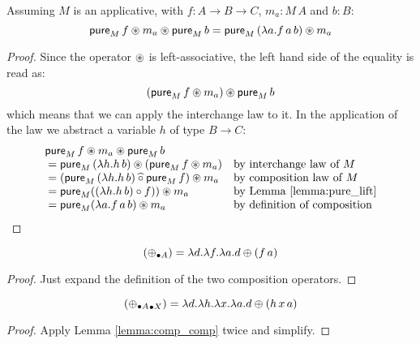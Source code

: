 \documentclass{article}
\newenvironment{lemma}[1]{%
  \renewcommand\thelemmainner{#1}%
  \lemmainner
}{\endlemmainner}
\begin{document}

\begin{lemma}{11}\label{lemma:applicative_flip}
Assuming $M$ is an applicative, with $f : A \rightarrow B \rightarrow C$, $m_a : M\, A$ and $b : B$:
$$
\mathsf{pure}_M\, f \circledast m_a \circledast \mathsf{pure}_M\, b = \mathsf{pure}_M\, (\lambda a . f\, a\, b) \circledast m_a
$$
\end{lemma}
\begin{proof}
Since the operator $\circledast$ is left-associative, the left hand side of the equality is read as:
$$
(\mathsf{pure}_M\, f \circledast m_a) \circledast \mathsf{pure}_M\, b
$$
which means that we can apply the interchange law to it.
In the application of the law we abstract a variable $h$ of type $B\rightarrow C$:
$$
\begin{array}{ll}
\mathsf{pure}_M\, f \circledast m_a \circledast \mathsf{pure}_M\, b \\
{} =  \mathsf{pure}_M\, (\lambda h. h\, b) \circledast (\mathsf{pure}_M\, f \circledast m_a)
 & \mbox{by interchange law of }M\\
{} =  (\mathsf{pure}_M\, (\lambda h. h\, b) \mathbin{\widehat{\circ}} \mathsf{pure}_M\, f) \circledast m_a
 & \mbox{by composition law of }M\\
{} =  \mathsf{pure}_M ( (\lambda h. h\, b) \circ f ) ) \circledast m_a
 & \mbox{by Lemma \ref{lemma:pure_lift}}\\
{} =  \mathsf{pure}_M (\lambda a. f\, a\, b ) \circledast m_a
 & \mbox{by definition of composition}\\
\end{array}
$$
\end{proof}


\begin{lemma}{13}\label{lemma:comp_comp}
$$
(\mathbin{\oplus_{\bullet A}}) = \lambda d.\lambda f. \lambda a. d\oplus (f\,a)
$$
\end{lemma}
\begin{proof}
Just expand the definition of the two composition operators.
\end{proof}

\begin{lemma}{14}\label{lemma:comp_comp_comp}
$$
(\mathbin{\mathbin{\oplus_{\bullet A}}_{\bullet X}}) =
\lambda d. \lambda h. \lambda x.\lambda a. d\oplus (h\,x\,a)
$$
\end{lemma}
\begin{proof}
Apply Lemma \ref{lemma:comp_comp} twice and simplify.
\end{proof}

\newpage
\end{document}
